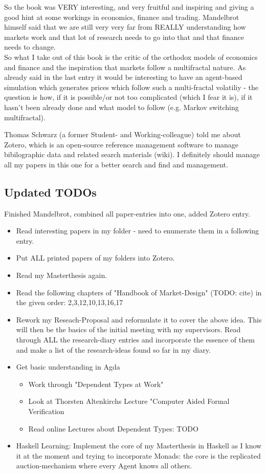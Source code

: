 \bigskip

So the book was VERY interesting, and very fruitful and inspiring and giving a good hint at some workings in economics, finance and trading. Mandelbrot himself said that we are still very very far from REALLY understanding how markets work and that lot of research needs to go into that and that finance needs to change. \\
So what I take out of this book is the critic of the orthodox models of economics and finance and the inspiration that markets follow a multifractal nature. As already said in the last entry it would be interesting to have an agent-based simulation which generates prices which follow such a multi-fractal volatiliy - the question is how, if it is possible/or not too complicated (which I fear it is), if it hasn't been already done and what model to follow (e.g. Markov switching multifractal).

\bigskip

Thomas Schwarz (a former Student- and Working-colleague) told me about Zotero, which is an open-source reference management software to manage bibilographic data and related search materials (wiki). I definitely should manage all my papers in this one for a better search and find and management.

\subsection*{Updated TODOs}
Finished Mandelbrot, combined all paper-entries into one, added Zotero entry.

\begin{itemize}
\item Read interesting papers in my folder - need to enumerate them in a following entry.
\item Put ALL printed papers of my folders into Zotero. 
\item Read my Masterthesis again.
\item Read the following chapters of "Handbook of Market-Design" (TODO: cite) in the given order: 2,3,12,10,13,16,17
\item Rework my Reseach-Proposal and reformulate it to cover the above idea. 
This will then be the basics of the initial meeting with my supervisors. Read through ALL the research-diary entries and incorporate the essence of them and make a list of the research-ideas found so far in my diary.
\item Get basic understanding in Agda 
	\begin{itemize}
	\item Work through "Dependent Types at Work"
	\item Look at Thorsten Altenkirchs Lecture "Computer Aided Formal Verification
	\item Read online Lectures about Dependent Types: TODO
	\end{itemize}
\item Haskell Learning: Implement the core of my Masterthesis in Haskell as I know it at the moment and trying to incorporate Monads: the core is the replicated auction-mechanism where every Agent knows all others.
\end{itemize}

